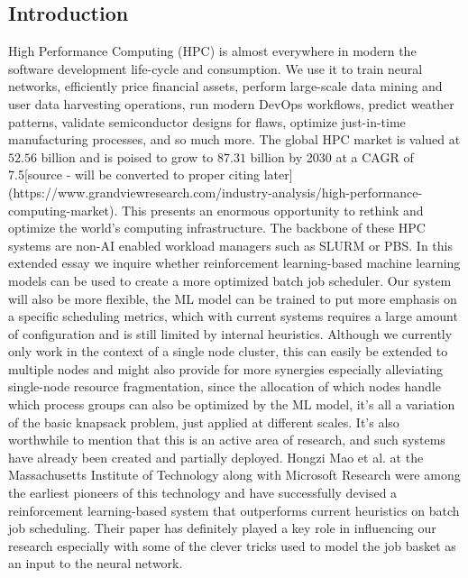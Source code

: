 \documentclass{article}
\begin{document}
\begin{spacing}{2.0}

\section{Introduction}

High Performance Computing (HPC) is almost everywhere in modern the software development life-cycle and consumption. We use it to train neural networks, efficiently price
financial assets, perform large-scale data mining and user data harvesting operations, run modern DevOps workflows, predict weather patterns, validate semiconductor designs
for flaws, optimize just-in-time manufacturing processes, and so much more. The global HPC market is valued at $52.56$ billion and is poised to grow to $87.31$ billion by 2030
at a CAGR of 7.5[source - will be converted to proper citing later](https://www.grandviewresearch.com/industry-analysis/high-performance-computing-market). This presents an
enormous opportunity to rethink and optimize the world's computing infrastructure. The backbone of these HPC systems are non-AI enabled workload managers such as SLURM or PBS.
In this extended essay we inquire whether reinforcement learning-based machine learning models can be used to create a more optimized batch job scheduler. Our system will also
be more flexible, the ML model can be trained to put more emphasis on a specific scheduling metrics, which with current systems requires a large amount of configuration and is
still limited by internal heuristics. Although we currently only work in the context of a single node cluster, this can easily be extended to multiple nodes and might also
provide for more synergies especially alleviating single-node resource fragmentation, since the allocation of which nodes handle which process groups can also be optimized by
the ML model, it's all a variation of the basic knapsack problem, just applied at different scales. It's also worthwhile to mention that this is an active area of research,
and such systems have already been created and partially deployed. Hongzi Mao et al. at the Massachusetts Institute of Technology along with Microsoft Research were among
the earliest pioneers of this technology and have successfully devised a reinforcement learning-based system that outperforms current heuristics on batch job scheduling.
Their paper has definitely played a key role in influencing our research especially with some of the clever tricks used to model the job basket as an input to the neural network.


\end{spacing}
\end{document}
